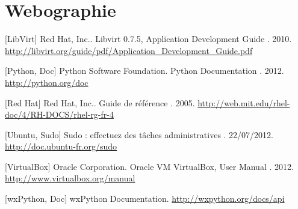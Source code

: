 


\cleardoublepage



\chapter*{Webographie}

\thispagestyle{empty}



[LibVirt] Red Hat, Inc.. \og Libvirt 0.7.5, Application Development Guide \fg. 2010. \href{http://libvirt.org/guide/pdf/Application\_Development\_Guide.pdf}{http://libvirt.org/guide/pdf/Application\_Development\_Guide.pdf}

[Python, Doc] Python Software Foundation. \og Python Documentation \fg. 2012. \href{http://python.org/doc}{http://python.org/doc}

[Red Hat] Red Hat, Inc.. \og Guide de référence \fg. 2005. \href{http://web.mit.edu/rhel-doc/4/RH-DOCS/rhel-rg-fr-4}{http://web.mit.edu/rhel-doc/4/RH-DOCS/rhel-rg-fr-4}

[Ubuntu, Sudo] \og Sudo : effectuez des tâches administratives \fg. 22/07/2012. \href{http://doc.ubuntu-fr.org/sudo}{http://doc.ubuntu-fr.org/sudo}

[VirtualBox] Oracle Corporation. \og Oracle VM VirtualBox, User Manual \fg. 2012. \href{http://www.virtualbox.org/manual}{http://www.virtualbox.org/manual}

[wxPython, Doc] wxPython Documentation. \href{http://wxpython.org/docs/api}{http://wxpython.org/docs/api}